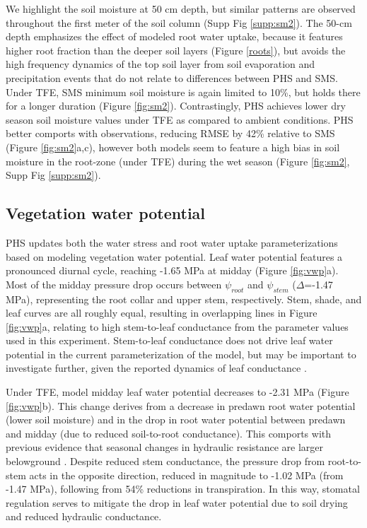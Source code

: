 \documentclass[draft,linenumbers]{agujournal}
\begin{document}
We highlight the soil moisture at 50 cm depth, but similar patterns are observed throughout the first meter of the soil column (Supp Fig \ref{supp:sm2}).
The 50-cm depth emphasizes the effect of modeled root water uptake, because it features higher root fraction than the deeper soil layers (Figure \ref{roots}), 
but avoids the high frequency dynamics of the top soil layer from soil evaporation and precipitation events that do not relate to differences between PHS and SMS.
Under TFE, SMS minimum soil moisture is again limited to 10\%, but holds there for a longer duration (Figure \ref{fig:sm2}).
Contrastingly, PHS achieves lower dry season soil moisture values under TFE as compared to ambient conditions.
PHS better comports with observations, reducing RMSE by 42\% relative to SMS (Figure \ref{fig:sm2}a,c),
however both models seem to feature a high bias in soil moisture in the root-zone (under TFE) during the wet season (Figure \ref{fig:sm2}, Supp Fig \ref{supp:sm2}).


\subsection{Vegetation water potential}

PHS updates both the water stress and root water uptake parameterizations based on modeling vegetation water potential.
Leaf water potential features a pronounced diurnal cycle, reaching -1.65 MPa at midday (Figure \ref{fig:vwp}a).
Most of the midday pressure drop occurs between $\psi_{root}$ and $\psi_{stem}$ ($\Delta$=-1.47 MPa), representing the root collar and upper stem, respectively.
Stem, shade, and leaf curves are all roughly equal, resulting in overlapping lines in Figure \ref{fig:vwp}a, relating to high stem-to-leaf conductance from the parameter values used in this experiment.
Stem-to-leaf conductance does not drive leaf water potential in the current parameterization of the model, but may be important to investigate further, given the reported dynamics of leaf conductance \citep{simonin2015}. 
    
    Under TFE, model midday leaf water potential decreases to -2.31 MPa (Figure \ref{fig:vwp}b). 
    This change derives from a decrease in predawn root water potential (lower soil moisture) and in the drop in root water potential between predawn and midday (due to reduced soil-to-root conductance).
    This comports with previous evidence that seasonal changes in hydraulic resistance are larger belowground \citep{fisher2006}.
    Despite reduced stem conductance, the pressure drop from root-to-stem acts in the opposite direction, reduced in magnitude to -1.02 MPa (from -1.47 MPa), following from 54\% reductions in transpiration.
    In this way, stomatal regulation serves to mitigate the drop in leaf water potential due to soil drying and reduced hydraulic conductance. 
\end{document}
